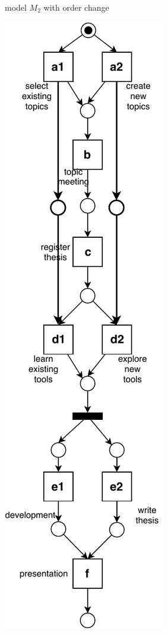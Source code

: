 \begin{figure}[htp]
\begin{subfigure}[b]{0.5\textwidth}
		\caption{model $M_{2}$ with order change}
		\label{fig:demo_s2_order}
	\end{subfigure}%
	\begin{subfigure}[b]{0.5\textwidth}
		\centering
		\includegraphics[width=0.8\linewidth, height=0.8\textheight]{figures/introduction/thesis-demo-s3-lt.pdf}

\end{subfigure}
\end{figure}
